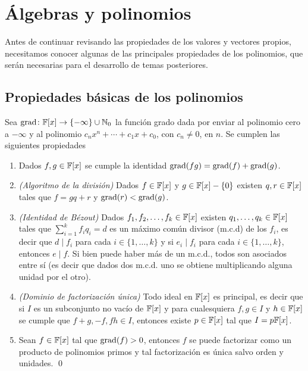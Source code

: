 \section{Álgebras y polinomios}

Antes de continuar revisando las propiedades de los valores y vectores propios, necesitamos conocer algunas de las principales propiedades de los polinomios, que serán necesarias para el desarrollo de temas posteriores.

\subsection{Propiedades básicas de los polinomios}

\begin{teor}
  Sea $\operatorname{grad}\colon \mathbb{F}[x] \to \{-\infty\} \cup \mathbb{N}_0$ la función grado dada por enviar al polinomio cero a $-\infty$ y al polinomio $c_n x^n + \cdots + c_1x + c_0$, con $c_n \neq 0$, en $n$. Se cumplen las siguientes propiedades
  \begin{enumerate}
    \item Dados $f, g \in \mathbb{F}[x]$ se cumple la identidad $\operatorname{grad}(fg) = \operatorname{grad}(f) + \operatorname{grad}(g)$.
    
    \item \emph{(Algoritmo de la división)} Dados $f \in \mathbb{F}[x]$ y $g \in \mathbb{F}[x] - \{0\}$ existen $q, r \in \mathbb{F}[x]$ tales que $f = gq+r$ y $\operatorname{grad}(r) < \operatorname{grad}(g)$.
    
    \item \emph{(Identidad de Bézout)} Dados $f_1, f_2, \ldots, f_k \in \mathbb{F}[x]$ existen $q_1, \ldots, q_k \in \mathbb{F}[x]$ tales que $\sum_{i=1}^k f_i q_i = d$ es un máximo común divisor (m.c.d) de los $f_i$, es decir que $d \mid f_i$ para cada $i \in \{1,\ldots,k\}$ y si $e_i \mid f_i$ para cada $i \in \{1,\ldots,k\}$, entonces $e \mid f$. Si bien puede haber más de un m.c.d., todos son asociados entre sí (es decir que dados dos m.c.d. uno se obtiene multiplicando alguna unidad por el otro).
    
    \item \emph{(Dominio de factorización única)} Todo ideal en $\mathbb{F}[x]$ es principal, es decir que si $I$ es un subconjunto no vacío de $\mathbb{F}[x]$ y para cualesquiera $f, g \in I$ y $h \in \mathbb{F}[x]$ se cumple que $f+g, -f, fh \in I$, entonces existe $p \in \mathbb{F}[x]$ tal que $I = p\mathbb{F}[x]$.
    
    \item Sean $f \in \mathbb{F}[x]$ tal que $\operatorname{grad}(f)>0$, entonces $f$ se puede factorizar como un producto de polinomios primos y tal factorización es única salvo orden y unidades. \qed
  \end{enumerate}
\end{teor}
 


